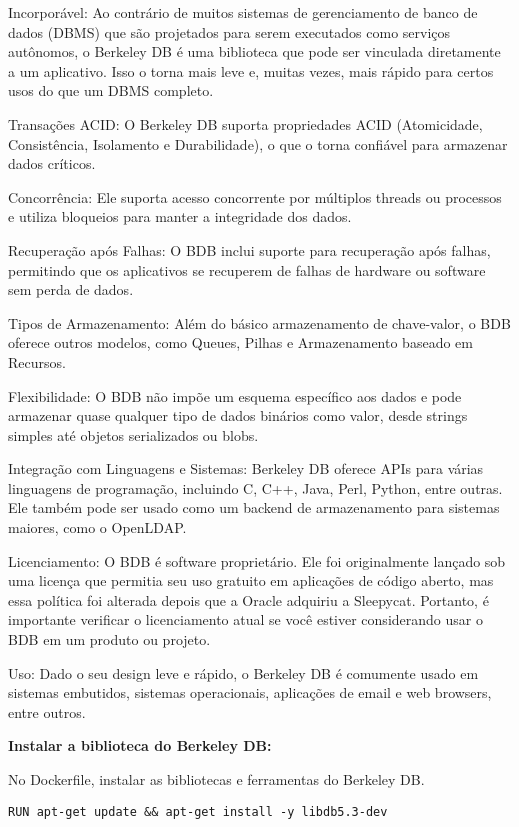 Incorporável: Ao contrário de muitos sistemas de gerenciamento de banco de dados (DBMS) que são projetados para serem executados como serviços autônomos, o Berkeley DB é uma biblioteca que pode ser vinculada diretamente a um aplicativo. Isso o torna mais leve e, muitas vezes, mais rápido para certos usos do que um DBMS completo.

Transações ACID: O Berkeley DB suporta propriedades ACID (Atomicidade, Consistência, Isolamento e Durabilidade), o que o torna confiável para armazenar dados críticos.

Concorrência: Ele suporta acesso concorrente por múltiplos threads ou processos e utiliza bloqueios para manter a integridade dos dados.

Recuperação após Falhas: O BDB inclui suporte para recuperação após falhas, permitindo que os aplicativos se recuperem de falhas de hardware ou software sem perda de dados.

Tipos de Armazenamento: Além do básico armazenamento de chave-valor, o BDB oferece outros modelos, como Queues, Pilhas e Armazenamento baseado em Recursos.

Flexibilidade: O BDB não impõe um esquema específico aos dados e pode armazenar quase qualquer tipo de dados binários como valor, desde strings simples até objetos serializados ou blobs.

Integração com Linguagens e Sistemas: Berkeley DB oferece APIs para várias linguagens de programação, incluindo C, C++, Java, Perl, Python, entre outras. Ele também pode ser usado como um backend de armazenamento para sistemas maiores, como o OpenLDAP.

Licenciamento: O BDB é software proprietário. Ele foi originalmente lançado sob uma licença que permitia seu uso gratuito em aplicações de código aberto, mas essa política foi alterada depois que a Oracle adquiriu a Sleepycat. Portanto, é importante verificar o licenciamento atual se você estiver considerando usar o BDB em um produto ou projeto.

Uso: Dado o seu design leve e rápido, o Berkeley DB é comumente usado em sistemas embutidos, sistemas operacionais, aplicações de email e web browsers, entre outros.

\textbf{Instalar a biblioteca do Berkeley DB:}

No Dockerfile, instalar as bibliotecas e ferramentas do Berkeley DB.

\begin{verbatim}
RUN apt-get update && apt-get install -y libdb5.3-dev
\end{verbatim}


